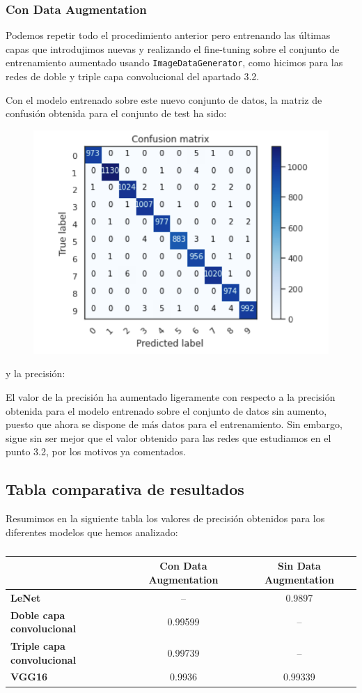 \documentclass[a4paper,11pt]{article}
\begin{document}
\subsubsection{Con Data Augmentation}
Podemos repetir todo el procedimiento anterior pero entrenando las últimas capas que introdujimos nuevas y realizando el fine-tuning sobre el conjunto de entrenamiento aumentado usando \texttt{ImageDataGenerator}, como hicimos para las redes de doble y triple capa convolucional del apartado 3.2. 

Con el modelo entrenado sobre este nuevo conjunto de datos, la matriz de confusión obtenida para el conjunto de test ha sido:
\begin{figure}[H]
	\centering
	\includegraphics[width=0.8\linewidth]{img/vgg6}
	\caption{}
	\label{fig:vgg6}
\end{figure}

y la precisión: 

El valor de la precisión ha aumentado ligeramente con respecto a la precisión obtenida para el modelo entrenado sobre el conjunto de datos sin aumento, puesto que ahora se dispone de más datos para el entrenamiento. Sin embargo, sigue sin ser mejor que el valor obtenido para las redes que estudiamos en el punto 3.2, por los motivos ya comentados. 
\newpage
\subsection{Tabla comparativa de resultados}

Resumimos en la siguiente tabla los valores de precisión obtenidos para los diferentes modelos que hemos analizado:
\begin{table}[H]
	\caption{}
	\begin{tabular}{|l|c|c|}
		\hline
		\multicolumn{1}{|c|}{\textbf{}} & \textbf{Con Data Augmentation} & \textbf{Sin Data Augmentation} \\ \hline
		\textbf{LeNet} & -- & 0.9897 \\ \hline
		\textbf{Doble capa convolucional} & 0.99599 & -- \\ \hline
		\textbf{Triple capa convolucional} & 0.99739 & -- \\ \hline
		\textbf{VGG16} & 0.9936 & 0.99339 \\ \hline
	\end{tabular}
	\label{}
\end{table}
\end{document}
